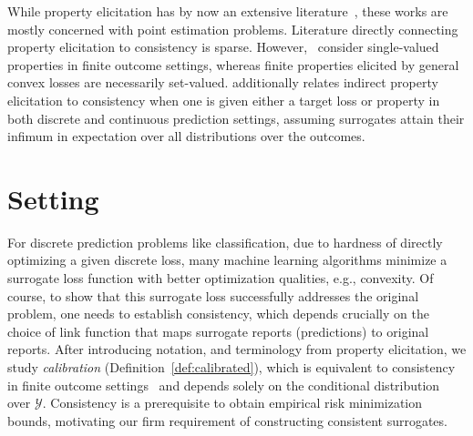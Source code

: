 \documentclass[11pt]{article}
\newcommand{\Y}{\mathcal{Y}}
\begin{document}
While property elicitation has by now an extensive literature~\citep{savage1971elicitation,osband1985information-eliciting,lambert2008eliciting,gneiting2011making,steinwart2014elicitation,frongillo2015vector-valued,fissler2016higher,lambert2018elicitation}, these works are mostly concerned with point estimation problems.
Literature directly connecting property elicitation to consistency is sparse.
However,~\citet{agarwal2015consistent} consider single-valued properties in finite outcome settings, whereas finite properties elicited by general convex losses are necessarily set-valued.
\citet{finocchiaro2021unifying} additionally relates indirect property elicitation to consistency when one is given either a target loss or property in both discrete and continuous prediction settings, assuming surrogates attain their infimum in expectation over all distributions over the outcomes.



\section{Setting}
\label{sec:setting}

For discrete prediction problems like classification, due to hardness of directly optimizing a given discrete loss, many machine learning algorithms minimize a surrogate loss function with better optimization qualities, e.g., convexity.
Of course, to show that this surrogate loss successfully addresses the original problem, one needs to establish consistency, which depends crucially on the choice of link function that maps surrogate reports (predictions) to original reports.
After introducing notation, and terminology from property elicitation, we study \emph{calibration} (Definition~\ref{def:calibrated}), which is equivalent to consistency in finite outcome settings~\citep{bartlett2006convexity,tewari2007consistency,ramaswamy2016convex} and depends solely on the conditional distribution over $\Y$.
Consistency is a prerequisite to obtain empirical risk minimization bounds, motivating our firm requirement of constructing consistent surrogates.
\end{document}
